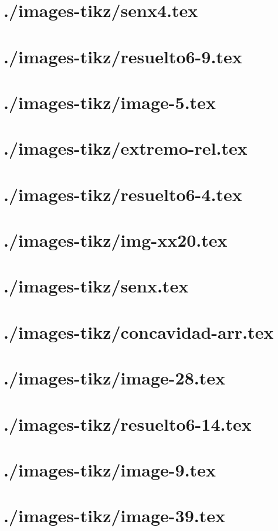 \documentclass[]{article}
\begin{document}
\section{./images-tikz/senx4.tex} 
\section{./images-tikz/resuelto6-9.tex} 
\section{./images-tikz/image-5.tex} 
\section{./images-tikz/extremo-rel.tex} 
\section{./images-tikz/resuelto6-4.tex} 
\section{./images-tikz/img-xx20.tex} 
\section{./images-tikz/senx.tex} 
\section{./images-tikz/concavidad-arr.tex} 
\section{./images-tikz/image-28.tex} 
\section{./images-tikz/resuelto6-14.tex} 
\section{./images-tikz/image-9.tex} 
\section{./images-tikz/image-39.tex} 
\end{document}
